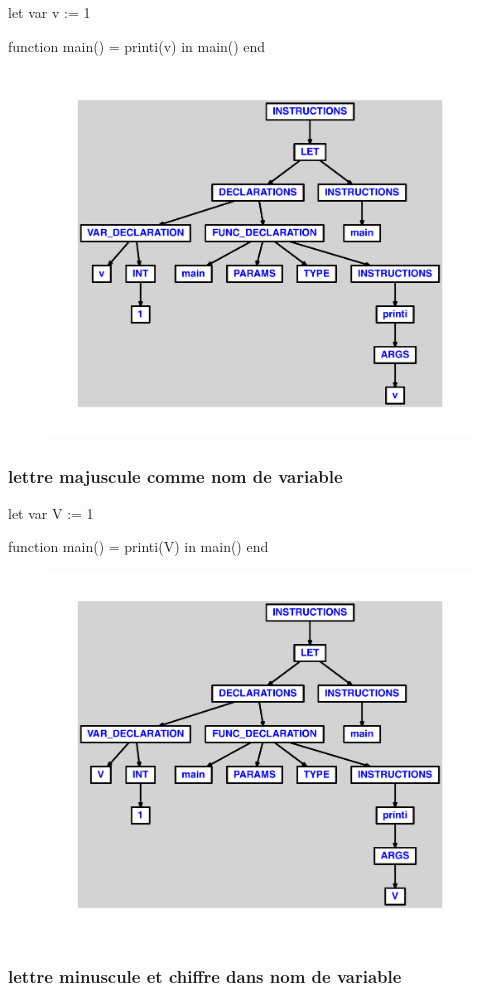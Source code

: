 \documentclass{article}
\begin{document}
\begin{verbatimtab}
let
	var v := 1

	function main() = printi(v)
in main() end
\end{verbatimtab}
\begin{figure}[H]\centering\includegraphics[max width=\textwidth]{ast/ast_306.pdf}\end{figure}\subsubsection{lettre majuscule comme nom de variable}
\begin{verbatimtab}
let
	var V := 1

	function main() = printi(V)
in main() end
\end{verbatimtab}
\begin{figure}[H]\centering\includegraphics[max width=\textwidth]{ast/ast_307.pdf}\end{figure}\subsubsection{lettre minuscule et chiffre dans nom de variable}
\end{document}

